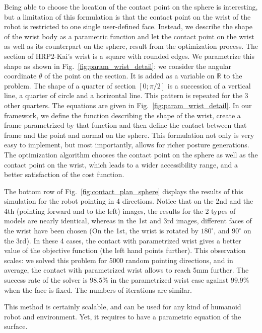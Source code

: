 Being able to choose the location of the contact point on the sphere is interesting, but a limitation of this formulation is that the contact point on the wrist of the robot is restricted to one single user-defined face.
Instead, we describe the shape of the wrist body as a parametric function and let the contact point on the wrist as well as its counterpart on the sphere, result from the optimization process.
The section of HRP2-Kai's wrist is a square with rounded edges.
We parametrize this shape as shown in Fig.~\ref{fig:param_wrist_detail}:
we consider the angular coordinate $\theta$ of the point on the section.
It is added as a variable on $\mathbb{R}$ to the problem.
The shape of a quarter of section $[0;\pi/2]$ is a succession of a vertical line, a quarter of circle and a horizontal line.
This pattern is repeated for the 3 other quarters.
The equations are given in Fig.~\ref{fig:param_wrist_detail}.
In our framework, we define the function describing the shape of the wrist, create a frame parametrized by that function and then define the contact between that frame and the point and normal on the sphere.
This formulation not only is very easy to implement, but most importantly, allows for richer posture generations.
The optimization algorithm chooses the contact point on the sphere as well as the contact point on the wrist, which leads to a wider accessibility range, and a better satisfaction of the cost function.

The bottom row of Fig.~\ref{fig:contact_plan_sphere} displays the results of this simulation for the robot pointing in 4 directions.
Notice that on the 2nd and the 4th (pointing forward and to the left) images, the results for the 2 types of models are nearly identical, whereas in the 1st and 3rd images, different faces of the wrist have been chosen (On the 1st, the wrist is rotated by $180^{\circ}$, and $90^{\circ}$ on the 3rd).
In these 4 cases, the contact with parametrized wrist gives a better value of the objective function (the left hand points further).
This observation scales:
we solved this problem for 5000 random pointing directions, and in average, the contact with parametrized wrist allows to reach 5mm further.
The success rate of the solver is $98.5\%$ in the parametrized wrist case against $99.9\%$ when the face is fixed.
The numbers of iterations are similar.

This method is certainly scalable, and can be used for any kind of humanoid robot and environment.
Yet, it requires to have a parametric equation of the surface.

